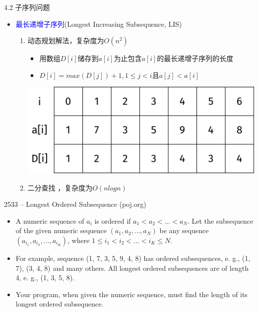 \begin{frame}{4.2 子序列问题}
    \begin{itemize}
        \item \textcolor{blue}{最长递增子序列}(Longest Increasing Subsequence, LIS)
        \vfill
        \begin{enumerate}
            \item 动态规划解法，复杂度为$O(n^2)$
            \begin{itemize}
                \item 用数组$D[i]$储存到$a[i]$为止包含$a[i]$的最长递增子序列的长度
                \item $D[i]=max⁡(D[j])+1,1\leq j < i$且$a[j] < a[i]$
            \end{itemize}
            \vfill
            \includegraphics{fig/4-4.pdf}
            \vfill
            \item 二分查找 ，复杂度为$O(nlogn)$
        \end{enumerate}
    \end{itemize}
\end{frame}
\begin{frame}{2533 -- Longest Ordered Subsequence (poj.org)}
    \begin{itemize}
        \item A numeric sequence of $a_i$ is ordered if $a_1 < a_2 < ... < a_N$. Let the subsequence of the given numeric sequence $(a_1, a_2, ..., a_N)$ be any sequence $(a_{i_1}, a_{i_2}, ..., a_{i_K})$, where $1 \leq i_1 < i_2 < ... < i_K \leq N$.
        \item For example, sequence (1, 7, 3, 5, 9, 4, 8) has ordered subsequences, e. g., (1, 7), (3, 4, 8) and many others. All longest ordered subsequences are of length 4, e. g., (1, 3, 5, 8).
        \item Your program, when given the numeric sequence, must find the length of its longest ordered subsequence.
    \end{itemize}
\end{frame}
